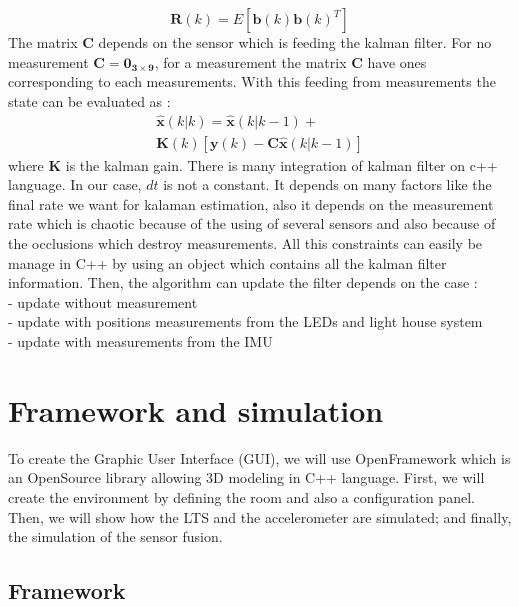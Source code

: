 \documentclass{vldb}
\begin{document}
\begin{equation}
\mathbf{R}(k) = E[ \mathbf{b}(k) \mathbf{b}(k)^T]
\end{equation} The matrix $\mathbf{C}$ depends on the sensor which is feeding the kalman filter. For no measurement $\mathbf{C} = \mathbf{0_{3 \times 9}}$, for a measurement the matrix $\mathbf{C}$ have ones corresponding to each measurements. With this feeding from measurements the state can be evaluated as :
\begin{equation}
 \begin{matrix}
\hat{\mathbf{x}}(k|k) = \hat{\mathbf{x}}(k|k-1) +\\ \mathbf{K}(k)[\mathbf{y}(k)-\mathbf{C}\hat{\mathbf{x}}(k|k-1)]
\end{matrix}   
\end{equation}
 where $\mathbf{K}$ is the kalman gain. There is many integration of kalman filter on c++ language. In our case, $dt$ is not a constant. It depends on many factors like the final rate we want for kalaman estimation, also it depends on the measurement rate which is chaotic because of the using of several sensors and also because of the occlusions which destroy measurements. All this constraints can easily be manage in C++ by using an object which contains all the kalman filter information. Then, the algorithm can update the filter depends on the case : \\ - update without measurement \\ - update with positions measurements from the LEDs and light house system \\ - update with measurements from the IMU



\section{Framework and simulation} \label{FS}

To create the Graphic User Interface (GUI), we will use OpenFramework which is an OpenSource library allowing 3D modeling in C++ language. First, we will create the environment by defining the room and also a configuration panel. Then, we will show how the LTS and the accelerometer are simulated; and finally, the simulation of the sensor fusion.

\subsection{Framework} \label{Frame}
\end{document}

